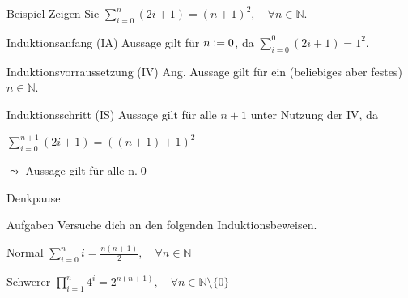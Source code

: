 \begin{frame}[fragile]{Beispiel}
Zeigen Sie $\displaystyle\sum_{i = 0}^{n} (2i+1) = (n+1)^2, \quad\forall n \in\mathbb{N}$.
\begin{alertblock}{Induktionsanfang (IA)}
    Aussage gilt für $n\vcentcolon=0$, da $\displaystyle\sum_{i = 0}^{0} (2i+1) = 1^2$.
\end{alertblock}
\begin{alertblock}{Induktionsvorraussetzung (IV)}
    Ang. Aussage gilt für ein (beliebiges aber festes) $n \in\mathbb{N}$.
\end{alertblock}
\begin{alertblock}{Induktionsschritt (IS)}
    Aussage gilt für alle $n+1$ unter Nutzung der IV, da\par
    $\displaystyle\sum_{i = 0}^{n+1} (2i+1) = ((n+1)+1)^2$
\end{alertblock}
\alert{$\leadsto$ Aussage gilt für alle n.}\qed
\end{frame}


{
\begin{frame}[fragile]{Denkpause}
    \begin{alertblock}{Aufgaben}
    Versuche dich an den folgenden Induktionsbeweisen.
    \end{alertblock}

    \begin{block}{Normal}
        $\displaystyle\sum_{i=0}^{n} i = \frac{n(n+1)}{2}, \quad \forall n \in \mathbb{N}$
    \end{block}
    \begin{block}{Schwerer}
        $\displaystyle\prod_{i=1}^{n} 4^i = 2^{n(n+1)}, \quad \forall n \in \mathbb{N}\setminus \{0\}$
    \end{block}
\end{frame}
}

